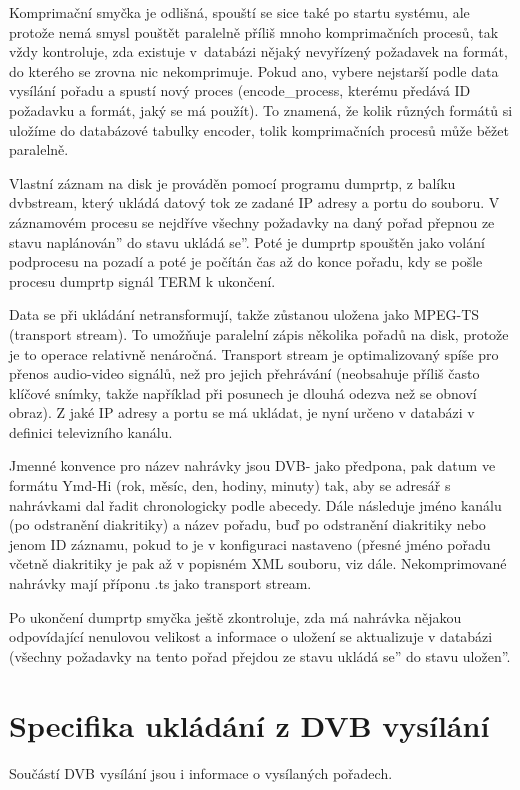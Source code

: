 Komprimační smyčka je odlišná, spouští se sice také po startu systému, ale protože nemá smysl pouštět paralelně příliš mnoho komprimačních procesů, tak vždy kontroluje, zda existuje v~databázi nějaký nevyřízený požadavek na formát, do kterého se zrovna nic nekomprimuje. Pokud ano, vybere nejstarší podle data vysílání pořadu a spustí nový proces (encode\_process, kterému předává ID požadavku a formát, jaký se má použít). To znamená, že kolik různých formátů si uložíme do databázové tabulky encoder, tolik komprimačních procesů může běžet paralelně.

Vlastní záznam na disk je prováděn pomocí programu dumprtp, z balíku dvbstream, který ukládá datový tok ze zadané IP adresy a portu do souboru. V záznamovém procesu se nejdříve všechny požadavky na daný pořad přepnou ze stavu \quotedblbase naplánován'' do stavu \quotedblbase ukládá se''. Poté je dumprtp spouštěn jako volání podprocesu na pozadí a poté je počítán čas až do konce pořadu, kdy se pošle procesu dumprtp signál TERM k ukončení. 

Data se při ukládání netransformují, takže zůstanou uložena jako MPEG-TS (transport stream). To umožňuje paralelní zápis několika pořadů na disk, protože je to operace relativně nenáročná. Transport stream je optimalizovaný spíše pro přenos audio-video signálů, než pro jejich přehrávání (neobsahuje příliš často klíčové snímky, takže například při posunech je dlouhá odezva než se obnoví obraz). Z jaké IP adresy a portu se má ukládat, je nyní určeno v databázi v definici televizního kanálu.

Jmenné konvence pro název nahrávky jsou DVB- jako předpona, pak datum ve formátu Ymd-Hi (rok, měsíc, den, hodiny, minuty) tak, aby se adresář s nahrávkami dal řadit chronologicky podle abecedy. Dále následuje jméno kanálu (po odstranění diakritiky) a název pořadu, buď po odstranění diakritiky nebo jenom ID záznamu, pokud to je v konfiguraci nastaveno (přesné jméno pořadu včetně diakritiky je pak až v popisném XML souboru, viz dále. Nekomprimované nahrávky mají příponu .ts jako transport stream.

Po ukončení dumprtp smyčka ještě zkontroluje, zda má nahrávka nějakou odpovídající nenulovou velikost a informace o uložení se aktualizuje v databázi (všechny požadavky na tento pořad přejdou ze stavu \quotedblbase ukládá se'' do stavu \quotedblbase uložen''.

\section{Specifika ukládání z DVB vysílání}
Součástí DVB vysílání jsou i informace o vysílaných pořadech.

